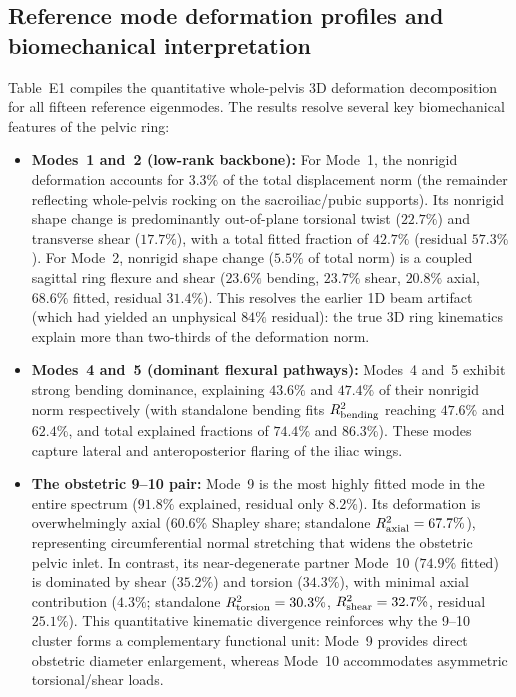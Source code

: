 \documentclass[11pt]{article}
\begin{document}
\subsection{Reference mode deformation profiles and biomechanical interpretation}
Table~E1 compiles the quantitative whole-pelvis 3D deformation decomposition for all fifteen reference eigenmodes.
The results resolve several key biomechanical features of the pelvic ring:
\begin{itemize}
\item \textbf{Modes~1 and~2 (low-rank backbone):}
For Mode~1, the nonrigid deformation accounts for $3.3\%$ of the total displacement norm (the remainder reflecting whole-pelvis rocking on the sacroiliac/pubic supports).
Its nonrigid shape change is predominantly out-of-plane torsional twist ($22.7\%$) and transverse shear ($17.7\%$), with a total fitted fraction of $42.7\%$ (residual $57.3\%$).
For Mode~2, nonrigid shape change ($5.5\%$ of total norm) is a coupled sagittal ring flexure and shear ($23.6\%$ bending, $23.7\%$ shear, $20.8\%$ axial, $68.6\%$ fitted, residual $31.4\%$).
This resolves the earlier 1D beam artifact (which had yielded an unphysical $84\%$ residual): the true 3D ring kinematics explain more than two-thirds of the deformation norm.

\item \textbf{Modes~4 and~5 (dominant flexural pathways):}
Modes~4 and~5 exhibit strong bending dominance, explaining $43.6\%$ and $47.4\%$ of their nonrigid norm respectively (with standalone bending fits $R^2_{\rm bending}$ reaching $47.6\%$ and $62.4\%$, and total explained fractions of $74.4\%$ and $86.3\%$).
These modes capture lateral and anteroposterior flaring of the iliac wings.

\item \textbf{The obstetric 9--10 pair:}
Mode~9 is the most highly fitted mode in the entire spectrum ($91.8\%$ explained, residual only $8.2\%$).
Its deformation is overwhelmingly axial ($60.6\%$ Shapley share; standalone $R^2_{\rm axial} = 67.7\%$), representing circumferential normal stretching that widens the obstetric pelvic inlet.
In contrast, its near-degenerate partner Mode~10 ($74.9\%$ fitted) is dominated by shear ($35.2\%$) and torsion ($34.3\%$), with minimal axial contribution ($4.3\%$; standalone $R^2_{\rm torsion} = 30.3\%$, $R^2_{\rm shear} = 32.7\%$, residual $25.1\%$).
This quantitative kinematic divergence reinforces why the 9--10 cluster forms a complementary functional unit: Mode~9 provides direct obstetric diameter enlargement, whereas Mode~10 accommodates asymmetric torsional/shear loads.
\end{itemize}
\end{document}

